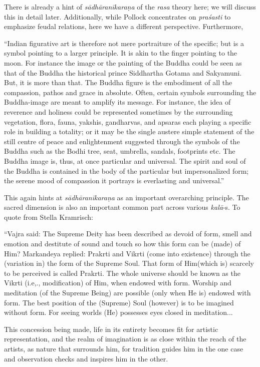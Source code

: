 There is already a hint of \textsl{sādhāranīkaraṇa} of the \textsl{rasa} theory here; we will discuss this in detail later. Additionally, while Pollock concentrates on \textsl{praśasti} to emphasize feudal relations, here we have a different perspective. Furthermore, 

\begin{myquote}
“Indian figurative art is therefore not mere portraiture of the specific; but is a symbol pointing to a larger principle. It is akin to the finger pointing to the moon. For instance the image or the painting of the Buddha could be seen as that of the Buddha the historical prince Siddhartha Gotama and Sakyamuni. But, it is more than that. The Buddha figure is the embodiment of all the compassion, pathos and grace in absolute. Often, certain symbols surrounding the Buddha-image are meant to amplify its message. For instance, the idea of reverence and holiness could be represented sometimes by the surrounding vegetation, flora, fauna, yakshis, gandharvas, and apsaras each playing a specific role in building a totality; or it may be the single austere simple statement of the still centre of peace and enlightenment suggested through the symbols of the Buddha such as the Bodhi tree, seat, umbrella, sandals, footprints etc. The Buddha image is, thus, at once particular and universal. The spirit and soul of the Buddha is contained in the body of the particular but impersonalized form; the serene mood of compassion it portrays is everlasting and universal.” 
\end{myquote}

This again hints at \textsl{sādhāranīkaraṇa} as an important overarching principle. The sacred dimension is also an important common part across various \textsl{kalā}-s. To quote from Stella Kramrisch:

\begin{myquote}
“Vajra said: The Supreme Deity has been described as devoid of form, smell and emotion and destitute of sound and touch so how this form can be (made) of Him? Markandeya replied: Prakrti and Vikrti (come into existence) through the (variation in) the form of the Supreme Soul. That form of Him(which is) scarcely to be perceived is called Prakrti. The whole universe should be known as the Vikrti (i.e,., modification) of Him, when endowed with form. Worship and meditation (of the Supreme Being) are possible (only when He is) endowed with form. The best position of the (Supreme) Soul (however) is to be imagined without form. For seeing worlds (He) possesses eyes closed in meditation... 

This concession being made, life in its entirety becomes fit for artistic representation, and the realm of imagination is as close within the reach of the artists, as nature that surrounds him, for tradition guides him in the one case and observation checks and inspires him in the other. 
\end{myquote}

